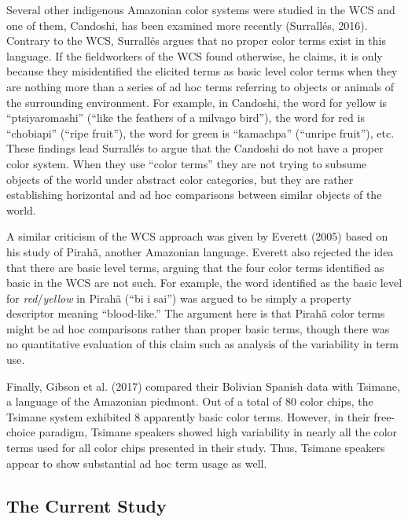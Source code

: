 \documentclass[
  ,apa7,floatsintext]{apa6}
\begin{document}
Several other indigenous Amazonian color systems were studied in the WCS and one of them, Candoshi, has been examined more recently (Surrallés, 2016). Contrary to the WCS, Surrallés argues that no proper color terms exist in this language. If the fieldworkers of the WCS found otherwise, he claims, it is only because they misidentified the elicited terms as basic level color terms when they are nothing more than a series of ad hoc terms referring to objects or animals of the surrounding environment. For example, in Candoshi, the word for yellow is ``ptsiyaromashi'' (``like the feathers of a milvago bird''), the word for red is ``chobiapi'' (``ripe fruit''), the word for green is ``kamachpa'' (``unripe fruit''), etc. These findings lead Surrallés to argue that the Candoshi do not have a proper color system. When they use ``color terms'' they are not trying to subsume objects of the world under abstract color categories, but they are rather establishing horizontal and ad hoc comparisons between similar objects of the world.

A similar criticism of the WCS approach was given by Everett (2005) based on his study of Pirahã, another Amazonian language. Everett also rejected the idea that there are basic level terms, arguing that the four color terms identified as basic in the WCS are not such. For example, the word identified as the basic level for \emph{red}/\emph{yellow} in Pirahã (``bi i sai'') was argued to be simply a property descriptor meaning ``blood-like.'' The argument here is that Pirahã color terms might be ad hoc comparisons rather than proper basic terms, though there was no quantitative evaluation of this claim such as analysis of the variability in term use.

Finally, Gibson et al. (2017) compared their Bolivian Spanish data with Tsimane, a language of the Amazonian piedmont. Out of a total of 80 color chips, the Tsimane system exhibited 8 apparently basic color terms. However, in their free-choice paradigm, Tsimane speakers showed high variability in nearly all the color terms used for all color chips presented in their study. Thus, Tsimane speakers appear to show substantial ad hoc term usage as well.

\hypertarget{the-current-study}{%
\subsection{The Current Study}\label{the-current-study}}
\end{document}
